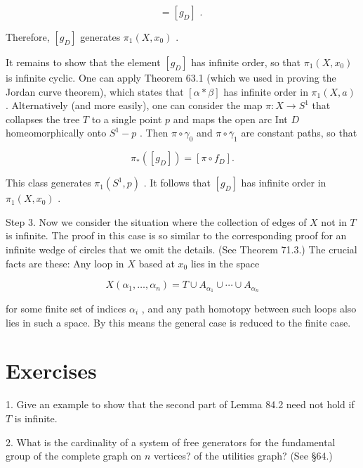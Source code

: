 \documentclass[10pt]{article}
\begin{document}
\[
= \left\lbrack  {g}_{D}\right\rbrack  \text{ . }
\]

Therefore, \(\left\lbrack  {g}_{D}\right\rbrack\) generates \({\pi }_{1}\left( {X,{x}_{0}}\right)\) .

It remains to show that the element \(\left\lbrack  {g}_{D}\right\rbrack\) has infinite order, so that \({\pi }_{1}\left( {X,{x}_{0}}\right)\) is infinite cyclic. One can apply Theorem 63.1 (which we used in proving the Jordan curve theorem), which states that \(\left\lbrack  {\alpha  * \beta }\right\rbrack\) has infinite order in \({\pi }_{1}\left( {X,a}\right)\) . Alternatively (and more easily), one can consider the map \(\pi  : X \rightarrow  {S}^{1}\) that collapses the tree \(T\) to a single point \(p\) and maps the open arc Int \(D\) homeomorphically onto \({S}^{1} - p\) . Then \(\pi  \circ  {\gamma }_{0}\) and \(\pi  \circ  {\overline{\gamma }}_{1}\) are constant paths, so that

\[
{\pi }_{ * }\left( \left\lbrack  {g}_{D}\right\rbrack  \right)  = \left\lbrack  {\pi  \circ  {f}_{D}}\right\rbrack  .
\]

This class generates \({\pi }_{1}\left( {{S}^{1},p}\right)\) . It follows that \(\left\lbrack  {g}_{D}\right\rbrack\) has infinite order in \({\pi }_{1}\left( {X,{x}_{0}}\right)\) .

Step 3. Now we consider the situation where the collection of edges of \(X\) not in \(T\) is infinite. The proof in this case is so similar to the corresponding proof for an infinite wedge of circles that we omit the details. (See Theorem 71.3.) The crucial facts are these: Any loop in \(X\) based at \({x}_{0}\) lies in the space

\[
X\left( {{\alpha }_{1},\ldots ,{\alpha }_{n}}\right)  = T \cup  {A}_{{\alpha }_{1}} \cup  \cdots  \cup  {A}_{{\alpha }_{n}}
\]

for some finite set of indices \({\alpha }_{i}\) , and any path homotopy between such loops also lies in such a space. By this means the general case is reduced to the finite case.

\section*{Exercises}

1. Give an example to show that the second part of Lemma 84.2 need not hold if \(T\) is infinite.

2. What is the cardinality of a system of free generators for the fundamental group of the complete graph on \(n\) vertices? of the utilities graph? (See §64.)
\end{document}
